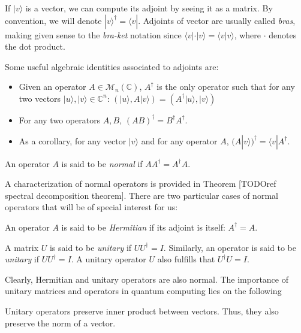 If $|v\rangle$ is a vector, we can compute its adjoint by seeing it as a matrix. By convention, we will denote $|v\rangle^\dagger = \langle v|$. Adjoints of vector are usually called \emph{bras}, making given sense to the \emph{bra-ket} notation since $\langle v| \cdot |v\rangle = \langle v|v\rangle$, where $\cdot$ denotes the dot product.

Some useful algebraic identities associated to adjoints are:

\begin{itemize}
	\item Given an operator $A \in \mathcal{M}_{n}(\mathds{C})$, $A^\dagger$ is the only operator such that for any two vectors $|u\rangle, |v\rangle \in \mathds{C}^n$: $( |u\rangle, A|v\rangle) = ( A^\dagger |u\rangle, |v\rangle)$
	\item For any two operators $A,B$, $(AB)^\dagger = B^\dagger A^\dagger$.
	\item As a corollary, for any vector $|v\rangle$ and for any operator $A$, $(A|v\rangle)^\dagger = \langle v|A^\dagger$.
\end{itemize}

\begin{definition}
	An operator $A$ is said to be \emph{normal} if $AA^\dagger = A^\dagger A$.
\end{definition}

A characterization of normal operators is provided in Theorem [TODOref spectral decomposition theorem]. There are two particular cases of normal operators that will be of special interest for us:

\begin{definition}
	An operator $A$ is said to be \emph{Hermitian} if its adjoint is itself: $A^\dagger = A$.
\end{definition}

\begin{definition}
	A matrix $U$ is said to be \emph{unitary} if $UU^\dagger = I$. Similarly, an operator is said to be \emph{unitary} if $UU^\dagger = I$. A unitary operator $U$ also fulfills that $U^\dagger U = I$.
\end{definition}

Clearly, Hermitian and unitary operators are also normal. The importance of unitary matrices and operators in quantum computing lies on the following

\begin{proposition}
	Unitary operators preserve inner product between vectors. Thus, they also preserve the norm of a vector.
\end{proposition}

